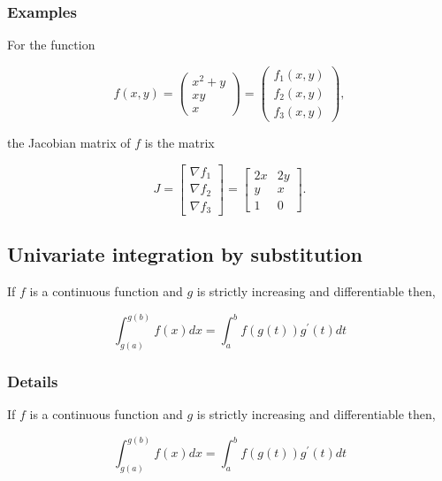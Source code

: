 \documentclass[12pt,a4paper]{article}
\theoremstyle{regla}
\theoremstyle{remark}
\theoremstyle{definition}
\theoremstyle{nonumberbreak}
\begin{document}
\subsubsection{Examples}
\begin{xmpl}

For the function 

$$f(x,y)=\begin{pmatrix}
  x^2 +y \\
  x y  \\
  x 
\end{pmatrix}
=
\begin{pmatrix}
  f_1(x,y) \\
  f_2(x,y) \\
  f_3(x,y) 
\end{pmatrix},$$

the Jacobian matrix of $f$ is the matrix

$$J= \begin{bmatrix}
      \nabla f_1 \\
      \nabla f_2 \\
      \nabla f_3 
      \end{bmatrix}
=
\begin{bmatrix}
      2x & 2y \\
      y & x \\
      1 & 0 
      \end{bmatrix}.
$$
\end{xmpl}

\subsection{Univariate integration by substitution}
\begin{fbox}
\begin{minipage}{0.97\textwidth}
If $f$ is a continuous function and $g$ is strictly increasing and differentiable then,


$$ \int_{g(a)}^{g(b)} f(x)dx =  \int_a^b f(g(t))g^\prime (t)dt$$


\end{minipage}
\end{fbox}
\subsubsection{Details}
If $f$ is a continuous function and $g$ is strictly increasing and differentiable then,


$$ \int_{g(a)}^{g(b)} f(x)dx =  \int_a^b f(g(t))g^\prime (t)dt$$
\end{document}
